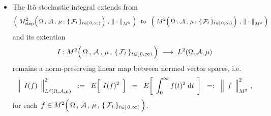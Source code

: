 \begin{remark}
\begin{itemize}
\item
	The It\^{o} stochastic integral extends from
	\begin{equation*}
	\left(\;
		M^{2}_{\textnormal{step}}\!\left(\,
			\overset{{\color{white}.}}{\Omega} \,,\, \mathcal{A} \,,\, \mu \,,\, \{\,\mathcal{F}_{t}\,\}_{t \in [\,0,\infty)}
			\,\right)
		\,,\,
		\left\Vert\;\cdot\;\right\Vert_{M^{2}}
		\;\right)
	\;\;\textnormal{to}\;\;
	\left(\;
		M^{2}\!\left(\,
			\overset{{\color{white}.}}{\Omega} \,,\, \mathcal{A} \,,\, \mu \,,\, \{\,\mathcal{F}_{t}\,\}_{t \in [\,0,\infty)}
			\,\right)
		\,,\,
		\left\Vert\;\cdot\;\right\Vert_{M^{2}}
		\;\right)
	\end{equation*}
	and its extention
	\begin{equation*}
	I : M^{2}\!
		\left(\,
			\overset{{\color{white}.}}{\Omega} \,,\, \mathcal{A} \,,\, \mu \,,\, \{\,\mathcal{F}_{t}\,\}_{t \in [\,0,\infty)}
			\,\right)
	\; \longrightarrow \;
	L^{2}(\Omega,\mathcal{A},\mu)
	\end{equation*}
	remains a norm-preserving linear map between normed vector spaces, i.e.
	\begin{equation*}
	\left\Vert\;\, \overset{{\color{white}.}}{I(f)} \,\;\right\Vert_{L^{2}(\Omega,\mathcal{A},\mu)}^{2}
	\;\; := \;\;
		E\!\left[\;\, \overset{{\color{white}.}}{I(f)^{2}} \,\;\right]
	\;\; = \;\;
		E\!\left[\;\,
			\int_{0}^{\infty} f(t)^{2} \;\d t
			\,\;\right]
	\;\; =: \;\;
		\left\Vert\;\, \overset{{\color{white}.}}{f} \,\;\right\Vert_{M^{2}}^{2}\,,
	\end{equation*}
	for each
	\,$f \in M^{2}\!
		\left(\,
			\overset{{\color{white}.}}{\Omega} \,,\, \mathcal{A} \,,\, \mu \,,\, \{\,\mathcal{F}_{t}\,\}_{t \in [\,0,\infty)}
			\,\right)$.

\end{itemize}
\end{remark}


